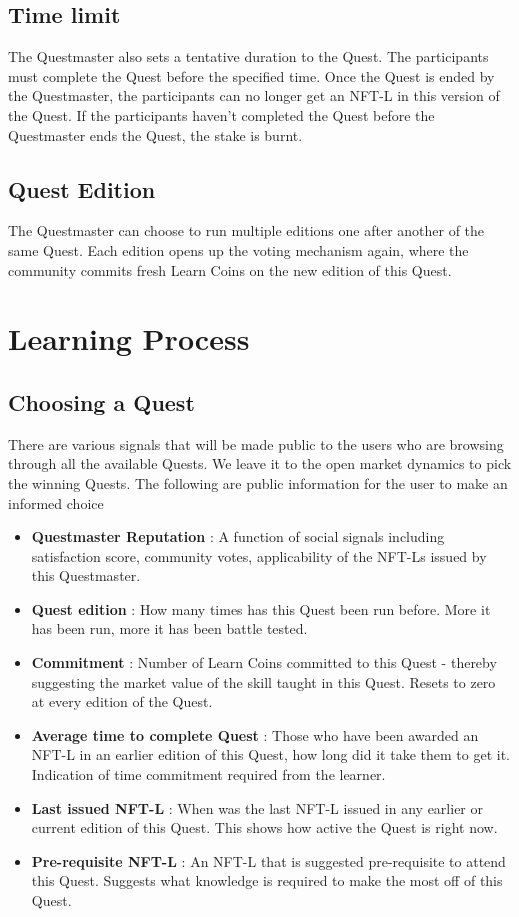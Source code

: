 \documentclass{article}
\begin{document}
    \subsection{Time limit}
      The Questmaster also sets a tentative duration to the Quest. The participants must complete the Quest before the specified time. 
      Once the Quest is ended by the Questmaster, the participants can no longer get an NFT-L in this version of the Quest. If the participants haven't completed the Quest before the Questmaster ends the Quest, the stake is burnt.
    \subsection{Quest Edition}
      The Questmaster can choose to run multiple editions one after another of the same Quest. Each edition opens up the voting mechanism again, where the community commits fresh Learn Coins on the new edition of this Quest. 
  \section{Learning Process}
    \subsection{Choosing a Quest}
        There are various signals that will be made public to the users who are browsing through all the available Quests. We leave it to the open market dynamics to pick the winning Quests.
        The following are public information for the user to make an informed choice
        \begin{itemize}
          \item \textbf{Questmaster Reputation }: A function of social signals including satisfaction score, community votes, applicability of the NFT-Ls issued by this Questmaster.
          \item \textbf{Quest edition }: How many times has this Quest been run before. More it has been run, more it has been battle tested.
          \item \textbf{Commitment }: Number of Learn Coins committed to this Quest - thereby suggesting the market value of the skill taught in this Quest. Resets to zero at every edition of the Quest.
          \item \textbf{Average time to complete Quest }: Those who have been awarded an NFT-L in an earlier edition of this Quest, how long did it take them to get it. Indication of time commitment required from the learner. 
          \item \textbf{Last issued NFT-L }:  When was the last NFT-L issued in any earlier or current edition of this Quest. This shows how active the Quest is right now. 
          \item \textbf{Pre-requisite NFT-L }: An NFT-L that is suggested pre-requisite to attend this Quest. Suggests what knowledge is required to make the most off of this Quest.
        \end{itemize}
\end{document}
